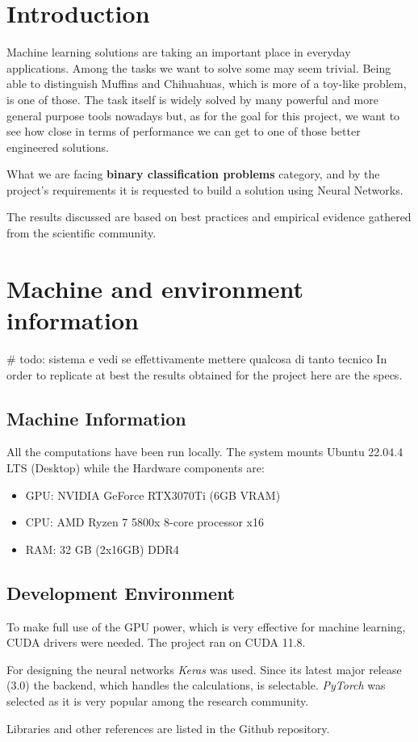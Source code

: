 \newpage


\section{Introduction}\label{sec:introduction}
Machine learning solutions are taking an important place in everyday applications.
Among the tasks we want to solve some may seem trivial.
Being able to distinguish Muffins and Chihuahuas, which is more of a toy-like problem, is one of those.
The task itself is widely solved by many powerful and more general purpose tools nowadays but,
as for the goal for this project, we want to see how close in terms of performance we can get to one of those better engineered solutions.

What we are facing \textbf{binary classification problems} category,
and by the project's requirements it is requested to build a solution using Neural Networks.

The results discussed are based on best practices and empirical evidence gathered from the scientific community.


\section{Machine and environment information}\label{sec:machine-and-environment-information}
# todo: sistema e vedi se effettivamente mettere qualcosa di tanto tecnico
In order to replicate at best the results obtained for the project here are the specs.

\subsection{Machine Information}\label{subsec:machine-information}

All the computations have been run locally.
The system mounts Ubuntu 22.04.4 LTS (Desktop) while the Hardware components are:

\begin{itemize}
    \item GPU: NVIDIA GeForce RTX3070Ti (6GB VRAM)
    \item CPU: AMD Ryzen 7 5800x 8-core processor x16
    \item RAM: 32 GB (2x16GB) DDR4
\end{itemize}

\subsection{Development Environment}\label{subsec:development-environment}
To make full use of the GPU power, which is very effective for machine learning, CUDA drivers were needed. The project ran on CUDA 11.8.

For designing the neural networks \textit{Keras} was used. Since its latest major release (3.0)
the backend, which handles the calculations, is selectable.
\textit{PyTorch} was selected as it is very popular among the research community.

Libraries and other references are listed in the Github repository\cite{todo}.
